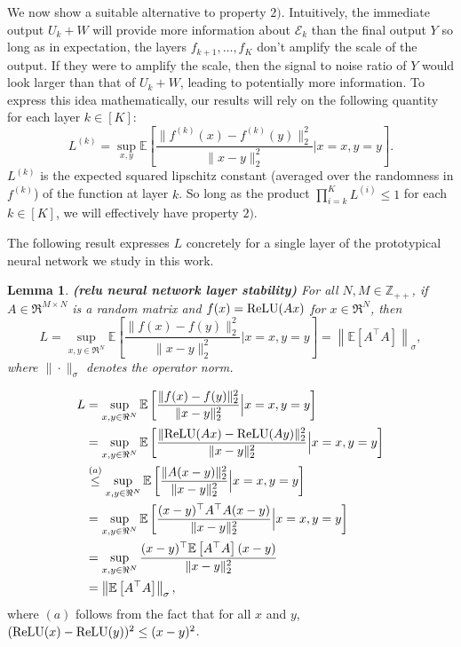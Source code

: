 \documentclass[twoside,11pt]{article}
\renewenvironment{proof}{\par\noindent{\bf Proof\ }}{\hfill\BlackBox\\[2mm]}
\newenvironment{proof}{\par\noindent{\bf Proof\ }}{\hfill\BlackBox\\[2mm]}
\newtheorem{lemma}[theorem]{Lemma}
\def\environment{\mathcal{E}}
\def\relu{{\rm ReLU}}
\def\E{\mathbb{E}}
\begin{document}
We now show a suitable alternative to property $2)$. Intuitively, the immediate output $U_k + W$ will provide more information about $\environment_k$ than the final output $Y$ so long as in expectation, the layers $f_{k+1}, \hdots, f_K$ don't amplify the scale of the output. If they were to amplify the scale, then the signal to noise ratio of $Y$ would look larger than that of $U_{k} + W$, leading to potentially more information. To express this idea mathematically, our results will rely on the following quantity for each layer $k \in [K]$:
$$L^{(k)} = \sup_{x,y}\E\left[\frac{\|f^{(k)}(x)-f^{(k)}(y)\|^2_2}{\|x-y\|^2_2}\Big|x=x,y=y\right].$$
$L^{(k)}$ is the expected squared lipschitz constant (averaged over the randomness in $f^{(k)}$) of the function at layer $k$. So long as the product $\prod_{i=k}^{K}L^{(i)} \leq 1$ for each $k \in [K]$, we will effectively have property $2)$.

The following result expresses $L$ concretely for a single layer of the prototypical neural network we study in this work.

\begin{lemma}{\bf (relu neural network layer stability)}
    \label{le:relu_stable}
    For all $N, M\in\mathbb{Z}_{++}$, if $A\in\Re^{M\times N}$ is a random matrix and $f(x) = \relu(Ax)$ for $x \in \Re^N$, then
    $$L = \sup_{x,y\in\Re^{N}}\E\left[\frac{\|f(x)-f(y)\|^2_2}{\|x-y\|^2_2}\Big|x=x, y=y\right] = \left\|\E\left[A^\top A\right]\right\|_\sigma,$$
    where $\|\cdot\|_\sigma$ denotes the operator norm.
\end{lemma}
\begin{proof}
    \begin{align*}
        L
        & = \sup_{x,y\in\Re^{N}}\E\left[\frac{\|f(x)-f(y)\|^2_2}{\|x-y\|^2_2}\Big|x=x, y=y\right]\\
        & = \sup_{x,y\in\Re^{N}}\E\left[\frac{\|\relu(Ax)-\relu(Ay)\|^2_2}{\|x-y\|^2_2}\Big|x=x, y=y\right]\\
        & \overset{(a)}{\leq} \sup_{x,y\in\Re^{N}}\E\left[\frac{\|A(x-y)\|^2_2}{\|x-y\|^2_2}\Big|x=x, y=y\right]\\
        & = \sup_{x,y\in\Re^{N}}\E\left[\frac{(x-y)^\top A^{\top}A(x-y)}{\|x-y\|^2_2}\Big|x=x, y=y\right]\\
        & = \sup_{x,y\in\Re^{N}} \frac{(x-y)^\top \E\left[A^{\top}A\right](x-y)}{\|x-y\|^2_2}\\
        & = \left\|\E\left[A^{\top}A\right]\right\|_\sigma,
    \end{align*}
    where $(a)$ follows from the fact that for all $x$ and $y$, $(\relu(x) - \relu(y))^2\leq (x-y)^2$.
\end{proof}
\end{document}
